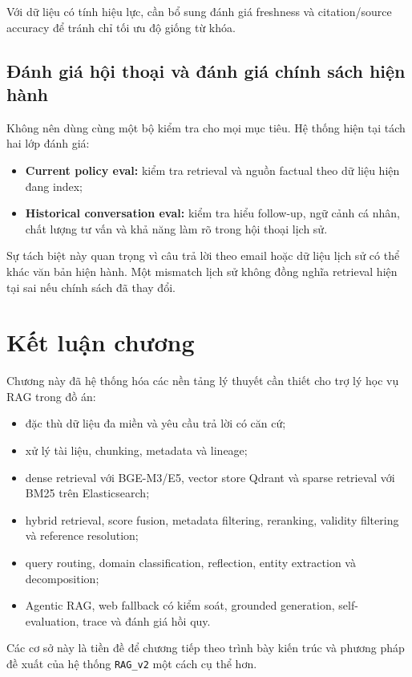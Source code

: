 \documentclass[../DoAn.tex]{subfiles}
\begin{document}
Với dữ liệu có tính hiệu lực, cần bổ sung đánh giá freshness và citation/source
accuracy để tránh chỉ tối ưu độ giống từ khóa.

\subsection{Đánh giá hội thoại và đánh giá chính sách hiện hành}

Không nên dùng cùng một bộ kiểm tra cho mọi mục tiêu. Hệ thống hiện tại tách hai
lớp đánh giá:

\begin{itemize}
    \item \textbf{Current policy eval:} kiểm tra retrieval và nguồn factual theo
    dữ liệu hiện đang index;
    \item \textbf{Historical conversation eval:} kiểm tra hiểu follow-up, ngữ cảnh
    cá nhân, chất lượng tư vấn và khả năng làm rõ trong hội thoại lịch sử.
\end{itemize}

Sự tách biệt này quan trọng vì câu trả lời theo email hoặc dữ liệu lịch sử có thể
khác văn bản hiện hành. Một mismatch lịch sử không đồng nghĩa retrieval hiện tại
sai nếu chính sách đã thay đổi.

\section{Kết luận chương}

Chương này đã hệ thống hóa các nền tảng lý thuyết cần thiết cho trợ lý học vụ
RAG trong đồ án:

\begin{itemize}
    \item đặc thù dữ liệu đa miền và yêu cầu trả lời có căn cứ;
    \item xử lý tài liệu, chunking, metadata và lineage;
    \item dense retrieval với BGE-M3/E5, vector store Qdrant và sparse retrieval
    với BM25 trên Elasticsearch;
    \item hybrid retrieval, score fusion, metadata filtering, reranking, validity
    filtering và reference resolution;
    \item query routing, domain classification, reflection, entity extraction và
    decomposition;
    \item Agentic RAG, web fallback có kiểm soát, grounded generation,
    self-evaluation, trace và đánh giá hồi quy.
\end{itemize}

Các cơ sở này là tiền đề để chương tiếp theo trình bày kiến trúc và phương pháp
đề xuất của hệ thống \texttt{RAG\_v2} một cách cụ thể hơn.
\end{document}

